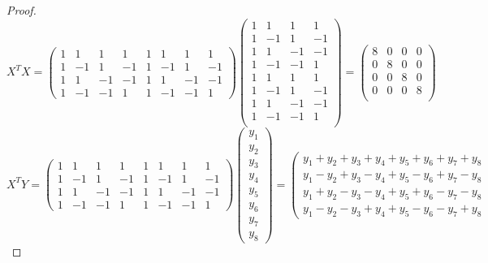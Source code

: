 \documentclass[12pt]{article}
\begin{document}
\begin{enumerate}[leftmargin=0cm,itemindent=.5cm,labelwidth=\itemindent,labelsep=0cm,align=left]
\begin{proof}
$$X^T X =
\left(
\begin{matrix}
1 & 1 & 1 & 1 & 1 & 1 & 1 & 1 \\
1 & -1 & 1 & -1 & 1 & -1 & 1 & -1 \\
1 & 1 & -1 & -1 & 1 & 1 & -1 & -1 \\
1 & -1 & -1 & 1 & 1 & -1 & -1 & 1
\end{matrix}\right)
\left( \begin{matrix}
1 & 1 & 1 & 1 \\
1 & -1 & 1 & -1 \\
1 & 1 & -1 & -1 \\
1 & -1 & -1 & 1 \\
1 & 1 & 1 & 1 \\
1 & -1 & 1 & -1 \\
1 & 1 & -1 & -1 \\
1 & -1 & -1 & 1 \\
\end{matrix} \right)
=
\left(
\begin{matrix}
8 & 0 & 0 & 0 \\
0 & 8 & 0 & 0 \\
0 & 0 & 8 & 0 \\
0 & 0 & 0 & 8 \\
\end{matrix}
\right)
$$
$$
X^T Y =
\left(
\begin{matrix}
1 & 1 & 1 & 1 & 1 & 1 & 1 & 1 \\
1 & -1 & 1 & -1 & 1 & -1 & 1 & -1 \\
1 & 1 & -1 & -1 & 1 & 1 & -1 & -1 \\
1 & -1 & -1 & 1 & 1 & -1 & -1 & 1
\end{matrix}\right)
\left(
\begin{matrix}
y_1 \\ y_2 \\ y_3 \\ y_4 \\ y_5 \\ y_6 \\ y_7 \\ y_8
\end{matrix}
\right)
=
\left(
\begin{matrix}
y_1 + y_2 + y_3 + y_4 + y_5 + y_6 + y_7 + y_8 \\
y_1 - y_2 + y_3 - y_4 + y_5 - y_6 + y_7 - y_8 \\
y_1 + y_2 - y_3 - y_4 + y_5 + y_6 - y_7 - y_8 \\
y_1 - y_2 - y_3 + y_4 + y_5 - y_6 - y_7 + y_8

\end{matrix}$$
\end{proof}
\end{enumerate}
\end{document}
